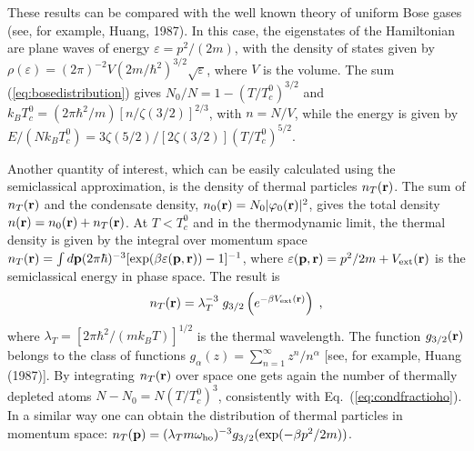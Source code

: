 These results can be compared with the well known theory of uniform
Bose gases (see, for example, Huang, 1987). In this case, the 
eigenstates of the Hamiltonian are plane waves of energy $\varepsilon =
p^2 / (2m)$, with the density of states given by $\rho (\varepsilon) =
(2\pi)^{-2} V (2m/\hbar^2)^{3/2} \sqrt{\varepsilon}$, where $V$ is
the volume. The sum (\ref{eq:bosedistribution}) gives
$N_0/N= 1 -(T/T_c^0)^{3/2}$  and $k_B T_c^0 = (2\pi \hbar^2 /m)
[n/\zeta(3/2)]^{2/3}$, with $n=N/V$, while the energy is given by 
$E/(Nk_BT_c^0)=3\zeta(5/2)/[2\zeta(3/2)](T/T_c^0)^{5/2}$. 

Another quantity of interest, which can be easily calculated using the
semiclassical approximation, is the density of thermal particles
$n_T({\bf r})$. The sum of $n_T({\bf r})$ and the condensate density,
$n_0({\bf r})=N_0|\varphi_0({\bf r})|^2$,   gives the total density
$n({\bf r})=n_0({\bf r})+n_T({\bf r})$. At $T<T_c^0$ and in the
thermodynamic limit, the thermal density is given by the integral
over momentum space $n_T({\bf r})=\int d{\bf p}(2\pi\hbar)^{-3}
[\exp(\beta \varepsilon({\bf p},{\bf r}))-1]^{-1}$, where
$\varepsilon({\bf p},{\bf r})= p^2/2m +V_{\rm ext}({\bf r})$ is the
semiclassical energy in phase space. The result is
\begin{equation}
n_T({\bf r}) = \lambda_T^{-3}\; g_{3/2}
\left( e^{-\beta V_{\rm ext}({\bf r})}
\right) \;,
\label{eq:nThor}
\end{equation}
where $\lambda_T=[2\pi\hbar^2/(mk_BT)]^{1/2}$ is the thermal wavelength.
The function $g_{3/2}({\bf r})$ belongs to the class of functions
$g_{\alpha}(z)=\sum_{n=1}^\infty z^n/n^\alpha$ [see, for example, 
Huang (1987)]. 
By integrating $n_T({\bf r})$ over space one gets again the
number of thermally depleted atoms $N-N_0=N(T/T_c^0)^3$, consistently with  
Eq.~(\ref{eq:condfractioho}). In a similar way one can obtain the
distribution of thermal particles in momentum space:
$n_T({\bf p}) = (\lambda_T m \omega_{\rm ho})^{-3} g_{3/2}
(\exp(-\beta p^2/2m))$. 

